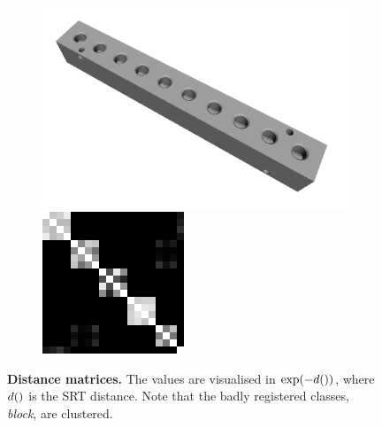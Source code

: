\begin{figure}[ht]
\begin{subfigure}[b]{0.23\linewidth}
		\includegraphics[width=\linewidth]{fig/reg/block.png} \\
		\includegraphics[width=\linewidth]{fig/reg/reg3Dtrain_block.png} 
	\end{subfigure}
	\caption{\textbf{Distance matrices.} The values are visualised in $\exp(-d())$, where $d()$ is the SRT distance. Note that the badly registered classes, \eg \emph{block}, are clustered.}
	\label{fig/reg/reg_srtmatrices}
\end{figure}

